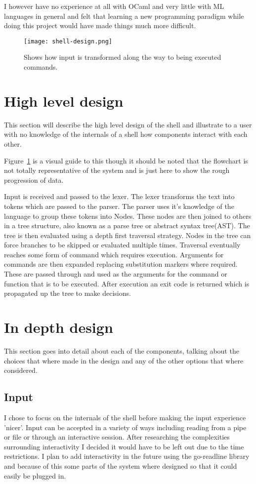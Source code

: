 I however have no experience at all with OCaml and very little with ML languages in general and felt that learning a new programming paradigm while doing this project would have made things much more difficult.


\begin{figure}[hp]
    \centering
    \texttt{[image: shell-design.png]}
    \caption[Shell execution pipeline]{Shows how input is transformed along the way to being executed commands.}
    \label{fig:shell-flowchart}
\end{figure}


\section{High level design}
This section will describe the high level design of the shell and illustrate to a user with no knowledge of the internals of a shell how components interact with each other.

Figure~\ref{fig:shell-flowchart} is a visual guide to this though it should be noted that the flowchart is not totally representative of the system and is just here to show the rough progression of data.

Input is received and passed to the lexer.
The lexer transforms the text into tokens which are passed to the parser.
The parser uses it's knowledge of the language to group these tokens into Nodes.
These nodes are then joined to others in a tree structure, also known as a parse tree or abstract syntax tree(AST).
The tree is then evaluated using a depth first traversal strategy.
Nodes in the tree can force branches to be skipped or evaluated multiple times.
Traversal eventually reaches some form of command which requires execution.
Arguments for commands are then expanded replacing substitution markers where required.
These are passed through and used as the arguments for the command or function that is to be executed.
After execution an exit code is returned which is propagated up the tree to make decisions.


\section{In depth design}
This section goes into detail about each of the components, talking about the choices that where made in the design and any of the other options that where considered.

\subsection{Input}
I chose to focus on the internals of the shell before making the input experience 'nicer'.
Input can be accepted in a variety of ways including reading from a pipe or file or through an interactive session.
After researching the complexities surrounding interactivity I decided it would have to be left out due to the time restrictions.
I plan to add interactivity in the future using the go-readline library\cite{GO-READLINE} and because of this some parts of the system where designed so that it could easily be plugged in.

